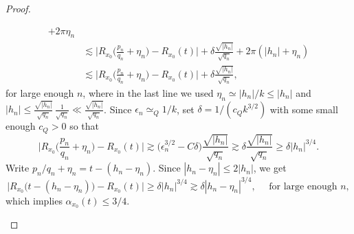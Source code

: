 \documentclass[10pt,a4paper]{amsart}
\begin{document}
\begin{proof}
\begin{itemize}
\begin{itemize}
\begin{itemize}
\begin{equation}
\begin{split}
		+ 2\pi \eta_n \\
		& \lesssim \Big|  R_{x_0}\Big( \frac{p_n}{q_n} + \eta_n \Big) - R_{x_0}(t) \Big| 
		+ \delta \frac{\sqrt{|h_n|}}{\sqrt{q_n}} 
		+ 2\pi ( |h_n|  + \eta_n)   \\
		& \lesssim \Big|  R_{x_0}\Big( \frac{p_n}{q_n} + \eta_n \Big) - R_{x_0}(t) \Big| 
		+ \delta \frac{\sqrt{|h_n|}}{\sqrt{q_n}},
		\end{split}
		\end{equation}
	for large enough $n$, 
	where in the last line we used $\eta_n \simeq |h_n|/k \leq |h_n|$
	and $|h_n| \leq  \frac{\sqrt{|h_n|}}{\sqrt{q_n}} \, \frac{1}{\sqrt{q_n}} \ll  \frac{\sqrt{|h_n|}}{\sqrt{q_n}}$. 
	Since $\epsilon_n \simeq_Q 1/k$, set  $\delta = 1/(c_Qk^{3/2})$ with some small enough $c_Q>0$ so that
	\begin{equation}
	\Big|  R_{x_0}\Big( \frac{p_n}{q_n} + \eta_n \Big) - R_{x_0}(t) \Big| 
	\gtrsim \Big(  \epsilon_n^{3/2} - C\delta \Big) \frac{\sqrt{|h_n|}}{\sqrt{q_n}} 
	\gtrsim \delta \frac{\sqrt{|h_n|}}{\sqrt{q_n}} 
	\geq \delta  |h_n|^{3/4}. 
	\end{equation}
	Write $p_n/q_n + \eta_n = t - (h_n -  \eta_n)$. 
	Since $|h_n - \eta_n| \leq 2|h_n|$, 
	we get 
	\begin{equation}
	\Big|  R_{x_0}\Big(  t - (h_n -  \eta_n) \Big) - R_{x_0}(t) \Big| 
	\geq \delta |h_n|^{3/4} 
	\gtrsim \delta |h_n -  \eta_n|^{3/4}, \quad \text{ for large enough } n, 
	\end{equation}
	which implies $\alpha_{x_0}(t) \leq 3/4$. 
		
	\end{itemize}
	

\end{itemize}
\end{itemize}
\end{proof}
\end{document}
